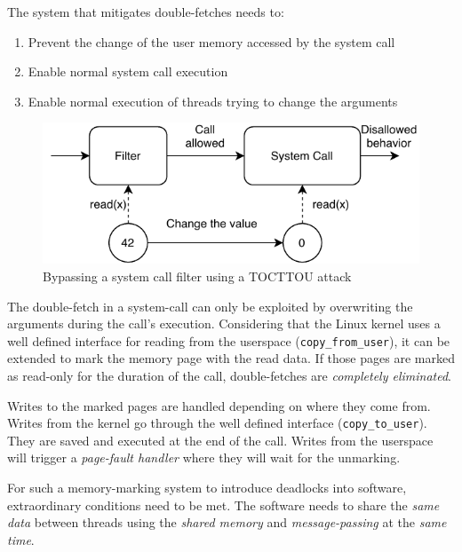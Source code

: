 
The system that mitigates double-fetches needs to:
\begin{enumerate}
  \item Prevent the change of the user memory accessed by the system call
  \item Enable normal system call execution
  \item Enable normal execution of threads trying to change the arguments
\end{enumerate}


\begin{figure}[]
  \centering
  \includegraphics[width=.85\linewidth]{img/tocttou.pdf}
  \caption{Bypassing a system call filter using a TOCTTOU attack}
  \label{fig:tocttou}
\end{figure}

The double-fetch in a system-call can only be exploited by overwriting the
arguments during the call's execution. Considering that the Linux kernel uses a
well defined interface for reading from the userspace
(\texttt{copy\_from\_user}), it can be extended to mark the memory page with the
read data. If those pages are marked as read-only for the duration of the call,
double-fetches are \emph{completely eliminated}.

Writes to the marked pages are handled depending on where they come from. Writes
from the kernel go through the well defined interface (\texttt{copy\_to\_user}).
They are saved and executed at the end of the call. Writes from the userspace
will trigger a \emph{page-fault handler} where they will wait for the unmarking.

For such a memory-marking system to introduce deadlocks into software,
extraordinary conditions need to be met. The software needs to
share the \emph{same data} between threads using the \emph{shared memory} and 
\emph{message-passing} at the \emph{same time}.

